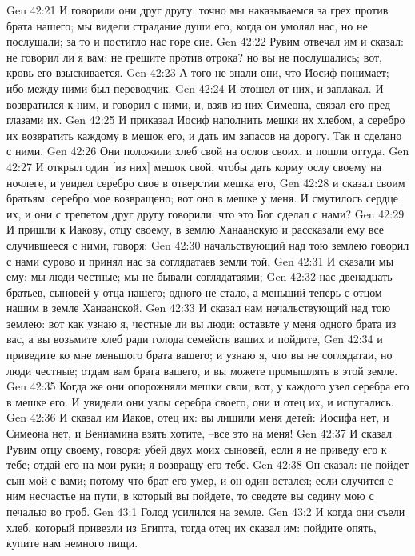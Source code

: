 Gen 42:21  И говорили они друг другу: точно мы наказываемся за грех против брата нашего; мы видели страдание души его, когда он умолял нас, но не послушали; за то и постигло нас горе сие.
Gen 42:22  Рувим отвечал им и сказал: не говорил ли я вам: не грешите против отрока? но вы не послушались; вот, кровь его взыскивается.
Gen 42:23  А того не знали они, что Иосиф понимает; ибо между ними был переводчик.
Gen 42:24  И отошел от них, и заплакал. И возвратился к ним, и говорил с ними, и, взяв из них Симеона, связал его пред глазами их.
Gen 42:25  И приказал Иосиф наполнить мешки их хлебом, а серебро их возвратить каждому в мешок его, и дать им запасов на дорогу. Так и сделано с ними.
Gen 42:26  Они положили хлеб свой на ослов своих, и пошли оттуда.
Gen 42:27  И открыл один [из них] мешок свой, чтобы дать корму ослу своему на ночлеге, и увидел серебро свое в отверстии мешка его,
Gen 42:28  и сказал своим братьям: серебро мое возвращено; вот оно в мешке у меня. И смутилось сердце их, и они с трепетом друг другу говорили: что это Бог сделал с нами?
Gen 42:29  И пришли к Иакову, отцу своему, в землю Ханаанскую и рассказали ему все случившееся с ними, говоря:
Gen 42:30  начальствующий над тою землею говорил с нами сурово и принял нас за соглядатаев земли той.
Gen 42:31  И сказали мы ему: мы люди честные; мы не бывали соглядатаями;
Gen 42:32  нас двенадцать братьев, сыновей у отца нашего; одного не стало, а меньший теперь с отцом нашим в земле Ханаанской.
Gen 42:33  И сказал нам начальствующий над тою землею: вот как узнаю я, честные ли вы люди: оставьте у меня одного брата из вас, а вы возьмите хлеб ради голода семейств ваших и пойдите,
Gen 42:34  и приведите ко мне меньшого брата вашего; и узнаю я, что вы не соглядатаи, но люди честные; отдам вам брата вашего, и вы можете промышлять в этой земле.
Gen 42:35  Когда же они опорожняли мешки свои, вот, у каждого узел серебра его в мешке его. И увидели они узлы серебра своего, они и отец их, и испугались.
Gen 42:36  И сказал им Иаков, отец их: вы лишили меня детей: Иосифа нет, и Симеона нет, и Вениамина взять хотите, --все это на меня!
Gen 42:37  И сказал Рувим отцу своему, говоря: убей двух моих сыновей, если я не приведу его к тебе; отдай его на мои руки; я возвращу его тебе.
Gen 42:38  Он сказал: не пойдет сын мой с вами; потому что брат его умер, и он один остался; если случится с ним несчастье на пути, в который вы пойдете, то сведете вы седину мою с печалью во гроб.
Gen 43:1  Голод усилился на земле.
Gen 43:2  И когда они съели хлеб, который привезли из Египта, тогда отец их сказал им: пойдите опять, купите нам немного пищи.
